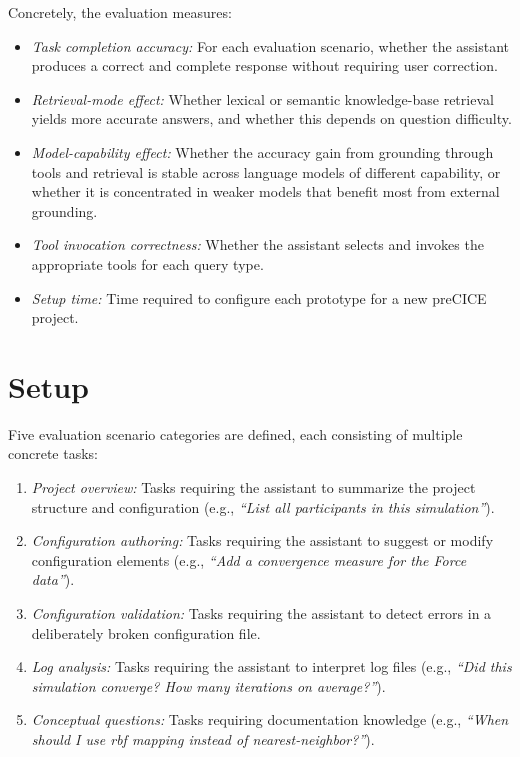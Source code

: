 \documentclass[
  numbers=noenddot,
  english,
  a4paper,
  twoside,
  bibliography=totoc,
  headsepline,
  cleardoublepage=empty,
  parskip=half,
  draft=false
]{scrbook}
\theoremstyle{break}
\renewcommand{\_}{\textunderscore\allowbreak}
\begin{document}
Concretely, the evaluation measures:

\begin{itemize}
  \item \emph{Task completion accuracy:} For each evaluation scenario, whether the assistant
        produces a correct and complete response without requiring user correction.
  \item \emph{Retrieval-mode effect:} Whether lexical or semantic knowledge-base retrieval
        yields more accurate answers, and whether this depends on question difficulty.
  \item \emph{Model-capability effect:} Whether the accuracy gain from grounding through tools
        and retrieval is stable across language models of different capability, or whether it is
        concentrated in weaker models that benefit most from external grounding.
  \item \emph{Tool invocation correctness:} Whether the assistant selects and invokes the
        appropriate tools for each query type.
  \item \emph{Setup time:} Time required to configure each prototype for a new preCICE project.
\end{itemize}


\section{Setup}\label{sec:evaluation:setup}

Five evaluation scenario categories are defined, each consisting of multiple concrete tasks:

\begin{enumerate}
  \item \emph{Project overview:} Tasks requiring the assistant to summarize the project
        structure and configuration (e.g., \emph{``List all participants in this simulation''}).
  \item \emph{Configuration authoring:} Tasks requiring the assistant to suggest or modify
        configuration elements (e.g., \emph{``Add a convergence measure for the Force data''}).
  \item \emph{Configuration validation:} Tasks requiring the assistant to detect errors in a
        deliberately broken configuration file.
  \item \emph{Log analysis:} Tasks requiring the assistant to interpret log files
        (e.g., \emph{``Did this simulation converge? How many iterations on average?''}).
  \item \emph{Conceptual questions:} Tasks requiring documentation knowledge
        (e.g., \emph{``When should I use \gls{rbf} mapping instead of nearest-neighbor?''}).
\end{enumerate}
\end{document}
